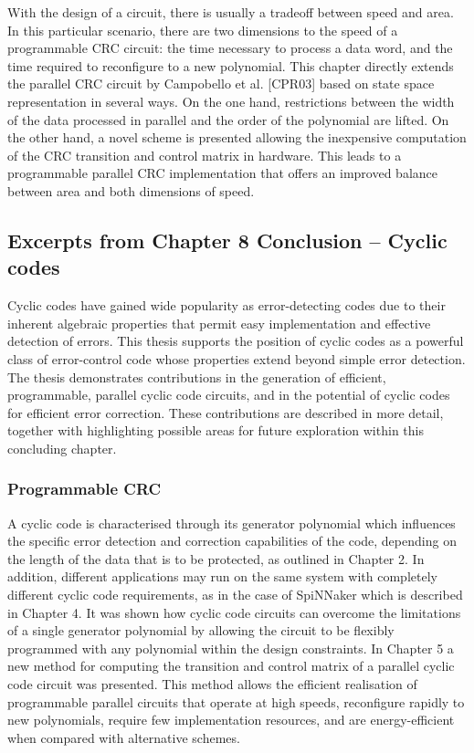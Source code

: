 \documentclass[a4paper, 11pt]{article}
\begin{document}
With the design of a circuit, there is usually a tradeoff between speed and area. In this particular scenario, there are two dimensions to the speed of a programmable CRC circuit: the time necessary to process a data word, and the time required to reconfigure to a new polynomial. This chapter directly extends the parallel CRC circuit by Campobello et al. [CPR03] based on state space representation in several ways. On the one hand, restrictions between the width of the data processed in parallel and the order of the polynomial are lifted. On the other hand, a novel scheme is presented allowing the inexpensive computation of the CRC transition and control matrix in hardware. This leads to a programmable parallel CRC implementation that offers an improved balance between area and both dimensions of speed.

\subsection{Excerpts from Chapter 8 Conclusion -- Cyclic codes}
Cyclic codes have gained wide popularity as error-detecting codes due to their inherent algebraic properties that permit easy implementation and effective detection of errors. This thesis supports the position of cyclic codes as a powerful class of error-control code whose properties extend beyond simple error detection. The thesis demonstrates contributions in the generation of efficient, programmable, parallel cyclic code circuits, and in the potential of cyclic codes for efficient error correction. These contributions are described in more detail, together with highlighting possible areas for future exploration within this concluding chapter.

\subsubsection{Programmable CRC}
A cyclic code is characterised through its generator polynomial which influences the specific error detection and correction capabilities of the code, depending on the length of the data that is to be protected, as outlined in Chapter 2. In addition, different applications may run on the same system with completely different cyclic code requirements, as in the case of SpiNNaker which is described in Chapter 4. It was shown how cyclic code circuits can overcome the limitations of a single generator polynomial by allowing the circuit to be flexibly programmed with any polynomial within the design constraints. In Chapter 5 a new method for computing the transition and control matrix of a parallel cyclic code circuit was presented. This method allows the efficient realisation of programmable parallel circuits that operate at high speeds, reconfigure rapidly to new polynomials, require few implementation resources, and are energy-efficient when compared with alternative schemes.
\end{document}
